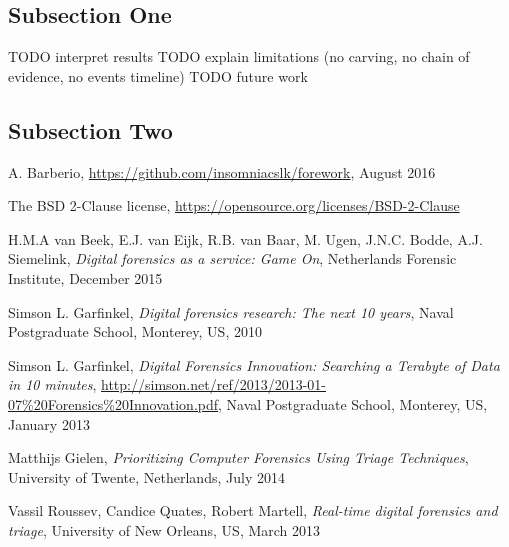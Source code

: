 \documentclass[twoside]{article}
\begin{document}
\begin{multicols}{2}
\subsection{Subsection One}

TODO interpret results
TODO explain limitations (no carving, no chain of evidence, no events timeline)
TODO future work

\lipsum[7] %

\subsection{Subsection Two}

\lipsum[8] %


\begin{thebibliography}{99} %

    A. Barberio,
    \href{https://github.com/insomniacslk/forework}{https://github.com/insomniacslk/forework},
    August 2016

    The BSD 2-Clause license,
    \href{https://opensource.org/licenses/BSD-2-Clause}{https://opensource.org/licenses/BSD-2-Clause}

    H.M.A van Beek, E.J. van Eijk, R.B. van Baar, M. Ugen, J.N.C. Bodde, A.J. Siemelink,
    \emph{Digital forensics as a service: Game On},
    Netherlands Forensic Institute,
    December 2015

    Simson L. Garfinkel,
    \emph{Digital forensics research: The next 10 years},
    Naval Postgraduate School, Monterey, US,
    2010

    Simson L. Garfinkel,
    \emph{Digital Forensics Innovation: Searching a Terabyte of Data in 10 minutes},
    \href{http://simson.net/ref/2013/2013-01-07\%20Forensics\%20Innovation.pdf}{http://simson.net/ref/2013/2013-01-07\%20Forensics\%20Innovation.pdf},
    Naval Postgraduate School, Monterey, US,
    January 2013

    Matthijs Gielen,
    \emph{Prioritizing Computer Forensics Using Triage Techniques},
    University of Twente, Netherlands,
    July 2014

    Vassil Roussev, Candice Quates, Robert Martell,
    \emph{Real-time digital forensics and triage},
    University of New Orleans, US,
    March 2013


\end{thebibliography}
\end{multicols}
\end{document}
